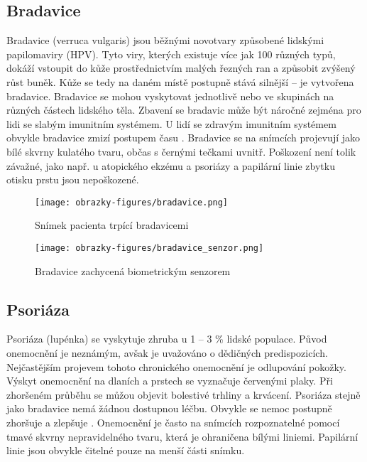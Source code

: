\subsection*{Bradavice}
Bradavice (verruca vulgaris) jsou běžnými novotvary způsobené lidskými papilomaviry (HPV). Tyto viry, kterých existuje více jak 100 různých typů, dokáží vstoupit do kůže prostřednictvím malých řezných ran a způsobit zvýšený růst buněk. Kůže se tedy na daném místě postupně stává silnější -- je vytvořena bradavice. Bradavice se mohou vyskytovat jednotlivě nebo ve skupinách na různých částech lidského těla. Zbavení se bradavic může být náročné zejména pro lidi se slabým imunitním systémem. U lidí se zdravým imunitním systémem obvykle bradavice zmizí postupem času \cite{WartsOverview}.  Bradavice se na snímcích projevují jako bílé skvrny kulatého tvaru, občas s černými tečkami uvnitř. Poškození není tolik závažné, jako např. u atopického ekzému a psoriázy a papilární linie zbytku otisku prstu jsou nepoškozené. 

\begin{figure}[!htbp]
  \begin{minipage}[b]{0.5\linewidth}
    \centering
    \texttt{[image: obrazky-figures/bradavice.png]}
    \caption{Snímek pacienta trpící bradavicemi \cite{InfluenceSkinDiseases}}
  \end{minipage}
  \hspace{0.5cm}
  \begin{minipage}[b]{0.5\linewidth}
    \centering
    \texttt{[image: obrazky-figures/bradavice\_senzor.png]}
    \caption{Bradavice zachycená biometrickým senzorem \cite{Barotova}}
  \end{minipage}
\end{figure}

\subsection*{Psoriáza}
Psoriáza (lupénka) se vyskytuje zhruba u 1 -- 3 \% lidské populace. Původ onemocnění je neznámým, avšak je uvažováno o dědičných predispozicích. Nejčastějším projevem tohoto chronického onemocnění je odlupování pokožky. Výskyt onemocnění na dlaních a prstech se vyznačuje červenými plaky. Při zhoršeném průběhu se můžou objevit bolestivé trhliny a krvácení. Psoriáza stejně jako bradavice nemá žádnou dostupnou léčbu. Obvykle se nemoc postupně zhoršuje a zlepšuje \cite{Psoriasis,InfluenceSkinDiseases}. Onemocnění je často na snímcích rozpoznatelné pomocí tmavé skvrny nepravidelného tvaru, která je ohraničena bílými liniemi. Papilární linie jsou obvykle čitelné pouze na menší části snímku.

